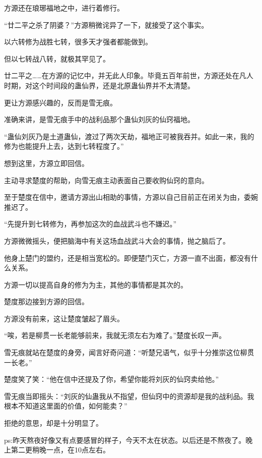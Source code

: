 \begin{this_body}
方源还在琅琊福地之中，进行着修行。

“廿二平之杀了阴婆？”方源稍微诧异了一下，就接受了这个事实。

以六转修为战胜七转，很多天才强者都能做到。

但以七转战八转，就极其罕见了。

廿二平之……在方源的记忆中，并无此人印象。毕竟五百年前世，方源还处在凡人时期，对这个时间段的蛊仙界，还是北原蛊仙界并不太清楚。

更让方源感兴趣的，反而是雪无痕。

准确来讲，是雪无痕手中的战利品那个蛊仙刘灰的仙窍福地。

“蛊仙刘灰乃是土道蛊仙，渡过了两次天劫，福地正可被我吞并。如此一来，我的修为也能提升上去，达到七转程度了。”

想到这里，方源立即回信。

主动寻求楚度的帮助，向雪无痕主动表面自己要收购仙窍的意向。

至于楚度在信中，邀请方源出山相助的事情，方源以自己目前正在闭关为由，委婉推迟了。

“先提升到七转修为，再参加这次的血战武斗也不嫌迟。”

方源微微摇头，便把脑海中有关这场血战武斗大会的事情，抛之脑后了。

他身上楚门的盟约，还是相当宽松的。即便楚门灭亡，方源一直不出面，都没有什么关系。

方源一切以提高自身的修为为主，其他的事情都是其次的。

楚度那边接到方源的回信。

方源没有前来，这让楚度皱起了眉头。

“唉，若是柳贯一长老能够前来，我就无须左右为难了。”楚度长叹一声。

雪无痕就站在楚度的身旁，闻言好奇问道：“听楚兄语气，似乎十分推崇这位柳贯一长老。”

楚度笑了笑：“他在信中还提及了你，希望你能将刘灰的仙窍卖给他。”

雪无痕当即摇头：“刘灰的仙蛊我从不指望，但仙窍中的资源却是我的战利品。我根本不知道这里面的价值，如何能卖？”

拒绝的意思，却是十分明显了。

ps:昨天熬夜好像又有点要感冒的样子，今天不太在状态。以后还是不熬夜了。晚上第二更稍晚一点，在10点左右。

\end{this_body}

